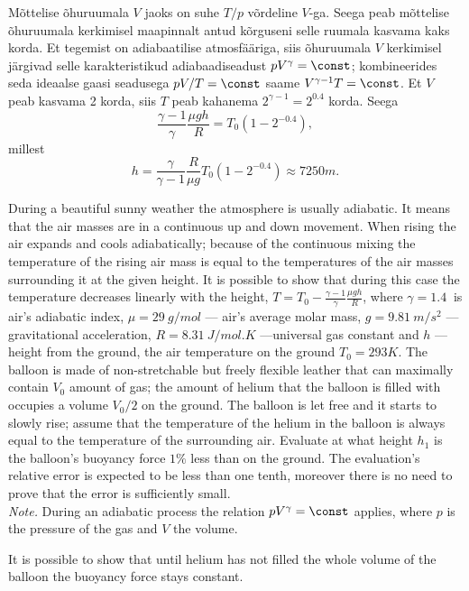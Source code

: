 Mõttelise õhuruumala $V$ jaoks on suhe $T/p$ võrdeline $V$-ga. Seega peab mõttelise õhuruumala kerkimisel maapinnalt antud kõrguseni selle ruumala kasvama kaks korda. Et tegemist on adiabaatilise atmosfääriga, siis õhuruumala $V$ kerkimisel järgivad selle karakteristikud adiabaadiseadust $pV^\gamma=\const$; kombineerides seda ideaalse gaasi seadusega $pV/T=\const$ saame $V^{\gamma-1}T=\const$. Et $V$ peab kasvama 2 korda, siis $T$ peab kahanema $2^{\gamma-1}=2^{0.4}$ korda. Seega
\[
\frac{\gamma-1}\gamma\frac{\mu g h}R =T_0(1-2^{-0.4}),
\]
millest
\[
h=\frac\gamma{\gamma-1}\frac R{\mu g}T_0(1-2^{-0.4})\approx\SI{7250}m.
\]

During a beautiful sunny weather the atmosphere is usually adiabatic. It means that the air masses are in a continuous up and down movement. When rising the air expands and cools adiabatically; because of the continuous mixing the temperature of the rising air mass is equal to the temperatures of the air masses surrounding it at the given height. It is possible to show that during this case the temperature decreases linearly with the height, $T=T_0-\frac{\gamma-1}\gamma\frac{\mu g h}R$, where $\gamma=\SI{1.4}{	}$ is air's adiabatic index, $\mu=\SI{29}{g/mol}$ — air's average molar mass, $g=\SI{9.81}{m/s^2}$ — gravitational acceleration, $R=\SI{8.31}{J/mol.K}$ —universal gas constant and $h$ — height from the ground, the air temperature on the ground $T_0=\SI{293}K$. The balloon is made of non-stretchable but freely flexible leather that can maximally contain $V_0$ amount of gas; the amount of helium that the balloon is filled with occupies a volume $V_0/2$ on the ground. The balloon is let free and it starts to slowly rise; assume that the temperature of the helium in the balloon is always equal to the temperature of the surrounding air. Evaluate at what height $h_1$ is the balloon's buoyancy force $1\%$ less than on the ground. The evaluation's relative error is expected to be less than one tenth, moreover there is no need to prove that the error is sufficiently small.\\
\emph{Note.}  During an adiabatic process the relation $pV^\gamma = \const$ applies, where $p$ is the pressure of the gas and $V$ the volume.

\hinteng
It is possible to show that until helium has not filled the whole volume of the balloon the buoyancy force stays constant.


